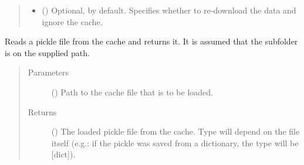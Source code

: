 \documentclass[letterpaper,10pt,english]{sphinxmanual}
\begin{document}
\begin{fulllineitems}
\begin{fulllineitems}
\begin{quote}
\begin{description}
\begin{itemize}
\item {} 
 () \textendash{} Optional,  by default. Specifies whether to
re-download the data and ignore the cache.

\end{itemize}

\end{description}\end{quote}

\end{fulllineitems}


\begin{fulllineitems}
\label{\detokenize{reference:pypath.main.PyPath.read_from_cache}}
Reads a pickle file from the cache and returns it. It is assumed
that the subfolder  is on the supplied path.
\begin{quote}\begin{description}
\item[{Parameters}] \leavevmode
{} () \textendash{} Path to the cache file that is to be loaded.

\item[{Returns}] \leavevmode
() \textendash{} The loaded pickle file from the cache. Type will
depend on the file itself (e.g.: if the pickle was saved
from a dictionary, the type will be {[}dict{]}).

\end{description}\end{quote}

\end{fulllineitems}



\end{fulllineitems}
\end{document}
